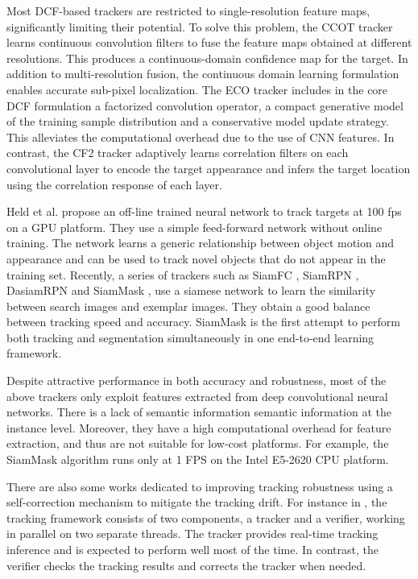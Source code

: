 \documentclass[review]{elsarticle}
\begin{document}
\begin{CJK*}{UTF8}{gbsn}
Most DCF-based trackers are restricted to single-resolution feature maps, significantly limiting their potential. To solve this problem, the CCOT tracker \cite{Danelljan2016BeyondCF} learns continuous convolution filters to fuse the feature maps obtained at different resolutions. This produces a continuous-domain confidence map for the target. In addition to multi-resolution fusion, the continuous domain learning formulation enables accurate sub-pixel localization.
The ECO tracker \cite{Danelljan2016ECOEC} includes in the core DCF formulation a factorized convolution operator, a compact generative model of the training sample distribution and a conservative model update strategy. This alleviates the computational overhead due to the use of CNN features. In contrast, the CF2 tracker \cite{Ma2015HierarchicalCF} adaptively learns correlation filters on each convolutional layer to encode the target appearance and infers the target location using the correlation response of each layer.

Held et al. \cite{held2016learning} propose an off-line trained neural network to track targets at 100 fps on a GPU platform. They use a simple feed-forward network without online training. The network learns a generic relationship between object motion and appearance and can be used to track novel objects that do not appear in the training set. 
Recently, a series of trackers such as SiamFC \cite{bertinetto2016fully}, SiamRPN \cite{Li2018HighPV}, DasiamRPN \cite{zhu2018distractor} and SiamMask \cite{Wang2018SiamMask}, use a siamese network to learn the similarity between search images and exemplar images. They obtain a good balance between tracking speed and accuracy. SiamMask is the first attempt to perform both tracking and segmentation simultaneously in one end-to-end learning framework.

Despite attractive performance in both accuracy and robustness, most of the above trackers only exploit features extracted from deep convolutional neural networks. There is a lack of semantic information semantic information at the instance level. Moreover, they have a high computational overhead for feature extraction, and thus are not suitable for low-cost platforms. For example, the SiamMask algorithm runs only at 1 FPS on the Intel E5-2620 CPU platform.

There are also some works dedicated to improving tracking robustness using a self-correction mechanism to mitigate the tracking drift. For instance in \cite{fan2017parallel}, the tracking framework consists of two components, a tracker and a verifier, working in parallel on two separate threads. The tracker provides real-time tracking inference and is expected to perform well most of the time. In contrast, the verifier checks the tracking results and corrects the tracker when needed.


\end{CJK*}
\end{document}
